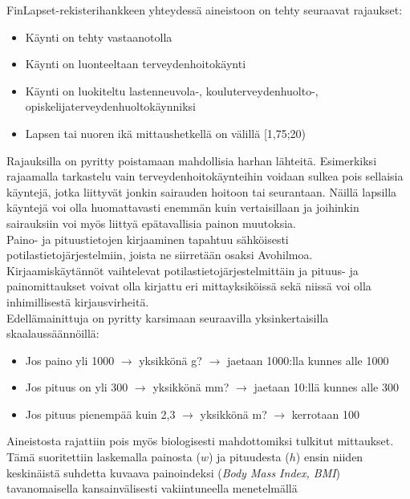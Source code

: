 \documentclass[finnish]{docopts}
\begin{document}
FinLapset-rekisterihankkeen yhteydessä aineistoon on tehty seuraavat rajaukset:

\begin{itemize}
    \item Käynti on tehty vastaanotolla
    \item Käynti on luonteeltaan terveydenhoitokäynti
    \item Käynti on luokiteltu lastenneuvola-, kouluterveydenhuolto-, opiskelijaterveydenhuoltokäynniksi
    \item Lapsen tai nuoren ikä mittaushetkellä on välillä [1,75;20)
\end{itemize}

Rajauksilla on pyritty poistamaan mahdollisia harhan lähteitä. Esimerkiksi rajaamalla tarkastelu vain terveydenhoitokäynteihin voidaan sulkea pois sellaisia käyntejä, jotka liittyvät jonkin sairauden hoitoon tai seurantaan. Näillä lapsilla käyntejä voi olla huomattavasti enemmän kuin vertaisillaan ja joihinkin sairauksiin voi myös liittyä epätavallisia painon muutoksia. \\

Paino- ja pituustietojen kirjaaminen tapahtuu sähköisesti potilastietojärjestelmiin, joista ne siirretään osaksi Avohilmoa. Kirjaamiskäytännöt vaihtelevat potilastietojärjestelmittäin ja pituus- ja painomittaukset voivat olla kirjattu eri mittayksiköissä sekä niissä voi olla inhimillisestä kirjausvirheitä.\\

Edellämainittuja on pyritty karsimaan seuraavilla yksinkertaisilla skaalaussäännöillä:

\begin{itemize}
    \item Jos paino yli 1000 $\longrightarrow$ yksikkönä g?  $\longrightarrow$ jaetaan 1000:lla kunnes alle 1000
    \item Jos pituus on yli 300 $\longrightarrow$ yksikkönä mm? $\longrightarrow$ jaetaan 10:llä kunnes alle 300
    \item Jos pituus pienempää kuin 2,3 $\longrightarrow$ yksikkönä m? $\longrightarrow$ kerrotaan 100
\end{itemize}

Aineistosta rajattiin pois myös biologisesti mahdottomiksi tulkitut mittaukset. Tämä suoritettiin laskemalla painosta ($w$) ja pituudesta ($h$) ensin niiden keskinäistä suhdetta kuvaava painoindeksi (\textit{Body Mass Index, BMI}) tavanomaisella kansainvälisesti vakiintuneella menetelmällä
\end{document}
